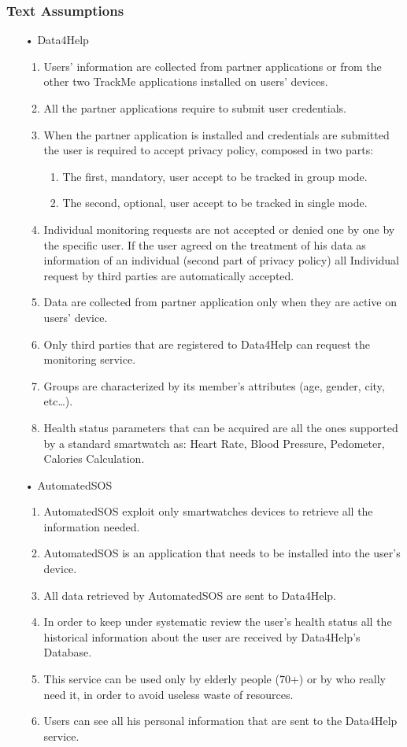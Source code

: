 \subsubsection{Text Assumptions}
\begin{enumerate}

\item[•] {\Large Data4Help}
	\begin{enumerate}
	\item Users' information are collected from partner applications or from the other two TrackMe applications installed on users' devices.
	\item All the partner applications require to submit user credentials.
	\item When the partner application is installed and credentials are submitted
	the user is required to accept privacy policy, composed in two parts:
		\begin{enumerate}
		\item The first, mandatory, user accept to be tracked in group mode.
		\item The second, optional, user accept to be tracked in single mode.
		\end{enumerate}
	\item Individual monitoring requests are not accepted or denied one by one by the specific user. If the user agreed on the treatment of his data as information of an individual (second part of privacy policy) all Individual request by third parties are automatically accepted.	
	\item Data are collected from partner application only when they are active on users' device.
	\item Only third parties that are registered to Data4Help can request the monitoring service.
	\item Groups are characterized by its member’s attributes (age, gender, city, etc…).
	\item Health status parameters that can be acquired are all the ones supported by a standard smartwatch as: Heart Rate, Blood Pressure, Pedometer, Calories Calculation.
	\end{enumerate}
	
\item[•] {\Large AutomatedSOS}
	\begin{enumerate}
	\item AutomatedSOS exploit only smartwatches devices to retrieve all the information needed.
	\item AutomatedSOS is an application that needs to be installed into the user's device.
	\item All data retrieved by AutomatedSOS are sent to Data4Help.
	\item In order to keep under systematic review the user's health status all the historical information about the user are received by Data4Help's Database.
    \item This service can be used only by elderly people (70+) or by who really need it, in order to avoid useless waste of resources.
    \item Users can see all his personal information that are sent to the Data4Help service. 
	\end{enumerate}
	

\end{enumerate}
